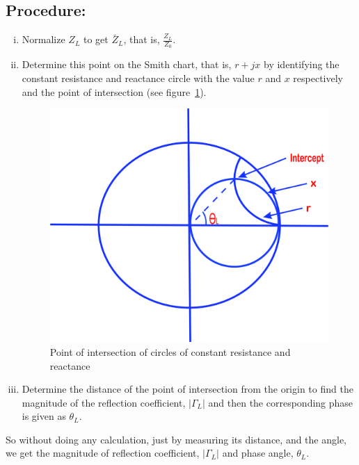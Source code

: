 \subsection*{Procedure:}
\begin{enumerate}[(i)]
\item Normalize $Z_{L}$ to get $\bar{Z}_{L}$, that is, $\frac{Z_{L}}{Z_{0}}$.
\item Determine this point on the Smith chart, that is, $r+jx$ by identifying the constant resistance and reactance circle with the value $r$ and $x$ respectively and the point of intersection (see figure~\ref{fig:lfds}).
\begin{figure}[h]
\centering
\includegraphics[width=0.7\linewidth]{./graphics/lfds}
\caption{Point of intersection of circles of constant resistance and reactance}
\label{fig:lfds}
\end{figure}

\item Determine the distance of the point of intersection from the origin to find the magnitude of the reflection coefficient, $|\Gamma_L|$ and then the corresponding phase is given as $\theta_L$.
\end{enumerate}

So without doing any calculation, just by measuring its distance, and the angle, we get the magnitude of reflection coefficient, $|\Gamma_L|$
and phase angle, $\theta_L$. 

